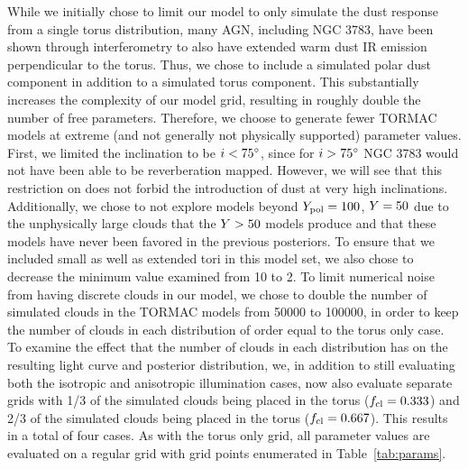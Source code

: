 \par While we initially chose to limit our model to only simulate the dust response from a single torus distribution, many AGN, including NGC 3783, have been shown through interferometry to also have extended warm dust IR emission perpendicular to the torus. Thus, we chose to include a simulated polar dust component in addition to a simulated torus component. This substantially increases the complexity of our model grid, resulting in roughly double the number of free parameters. Therefore, we choose to generate fewer TORMAC models at extreme (and not generally not physically supported) parameter values. First, we limited the inclination to be $i < 75\degree$, since for $i > 75\degree$ NGC 3783 would not have been able to be reverberation mapped. However, we will see that this restriction on \inc does not forbid the introduction of dust at very high inclinations. Additionally, we chose to not explore models beyond $Y_{\text{pol}} = 100$, $Y = 50$ due to the unphysically large clouds that the $Y >50$ models produce and that these models have never been favored in the previous posteriors. To ensure that we included small as well as extended tori in this model set, we also chose to decrease the minimum \Y value examined from 10 to 2. To limit numerical noise from having discrete clouds in our model, we chose to double the number of simulated clouds in the TORMAC models from 50000 to 100000, in order to keep the number of clouds in each distribution of order equal to the torus only case. To examine the effect that the number of clouds in each distribution has on the resulting light curve and posterior distribution, we, in addition to still evaluating both the isotropic and anisotropic illumination cases, now also evaluate separate grids with 1/3 of the simulated clouds being placed in the torus ($f_{\text{cl}} = 0.333$) and 2/3 of the simulated clouds being placed in the torus ($f_{\text{cl}} = 0.667$). This results in a total of four cases. As with the torus only grid, all parameter values are evaluated on a regular grid with grid points enumerated in Table~\ref{tab:params}. 

